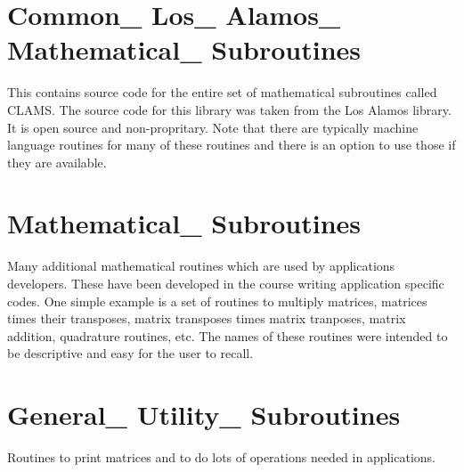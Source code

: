 \documentclass[onecolumn,letterpaper]{report}
\begin{document}
\section{Common\_ Los\_ Alamos\_ Mathematical\_ Subroutines}
This contains source code for the entire set of mathematical subroutines called
CLAMS.  The source code for this library was taken from the Los Alamos library.  It is
open source and non-propritary.  Note that there are typically machine language routines
for many of these routines and there is an option to use those if they are available.
\section{Mathematical\_ Subroutines}
Many additional mathematical routines which are used by applications developers.  These have been
developed in the course writing application specific codes.  One simple example is a set of
routines to multiply matrices, matrices times their transposes, matrix transposes times matrix
tranposes, matrix addition, quadrature routines, etc.  The names of these routines were intended
to be descriptive and easy for the user to recall.
\section{General\_ Utility\_ Subroutines}
Routines to print matrices and to do lots of operations needed in applications.
\end{document}
